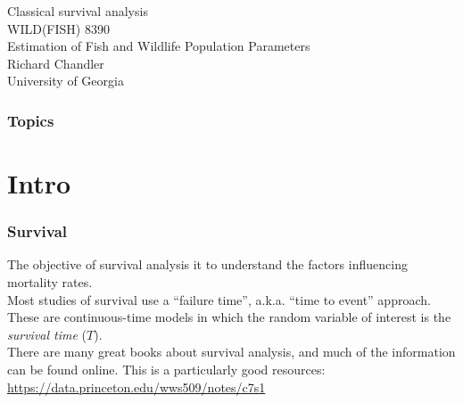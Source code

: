 \documentclass[color=usenames,dvipsnames]{beamer}\usepackage[]{graphicx}\usepackage[]{color}
\begin{document}
\begin{frame}[plain]
  \centering
  \LARGE
  Classical survival analysis \\
  \vfill
  \large
  WILD(FISH) 8390 \\
  Estimation of Fish and Wildlife Population Parameters \\
  \vfill
  Richard Chandler \\
  University of Georgia \\
\end{frame}







\begin{frame}[plain]
  \frametitle{Topics}
  \Large
\end{frame}




\section{Intro}





\begin{frame}
  \frametitle{Survival}
  \large
  The objective of survival analysis it to understand the factors
  influencing mortality rates. \\
  \pause
  \vfill
  Most studies of survival use a ``failure time'', a.k.a. ``time to event''
  approach. \\ 
  \pause
  \vfill
  These are continuous-time models in which the random variable of
  interest is the {\it survival time} ($T$). \\
  \pause
  \vfill
  There are many great books about survival analysis, and much of the
  information can be found online. This is a particularly good
  resources: \\
  \vfill
  \centering
  \color{blue} \url{
    https://data.princeton.edu/wws509/notes/c7s1
  } \\
\end{frame}
\end{document}
